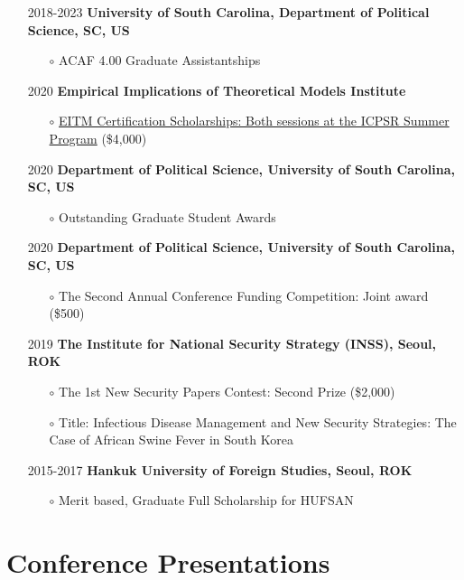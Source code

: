 \documentclass[margin,line]{res}
\begin{document}
\begin{resume}
\begin{itemize}[wide = 0pt] \itemsep 1.5mm
	\item[2018-2023] \textbf{University of South Carolina, Department of Political Science, SC, US}
	\begin{itemize} 
		\item[$\circ$] ACAF 4.00 Graduate Assistantships
	\end{itemize} 
	\item[2020] \textbf{Empirical Implications of Theoretical Models Institute}
	\begin{itemize}
		\item[$\circ$] \href{https://52.2.147.143/icpsrweb/content/sumprog/scholarships/winners-2020.html}{EITM Certification Scholarships: Both sessions at the ICPSR Summer Program} (\$4,000)
	\end{itemize} 
	\item[2020] \textbf{Department of Political Science, University of South Carolina, SC, US}
	\begin{itemize}
		\item[$\circ$] Outstanding Graduate Student Awards
	\end{itemize} 
	\item[2020] \textbf{Department of Political Science, University of South Carolina, SC, US}
	\begin{itemize}
		\item[$\circ$] The Second Annual Conference Funding Competition: Joint award (\$500)
	\end{itemize} 
	\item[2019] \textbf{The Institute for National Security Strategy (INSS), Seoul, ROK}
	\begin{itemize}\itemsep -1mm 
		\item[$\circ$] The 1st New Security Papers Contest: Second Prize (\$2,000)
		\item[$\circ$] Title: Infectious Disease Management and New Security Strategies: The Case of African Swine Fever in South Korea
	\end{itemize}
	\item[2015-2017] \textbf{Hankuk University of Foreign Studies, Seoul, ROK}
	\begin{itemize} 
		\item[$\circ$] Merit based, Graduate Full Scholarship for HUFSAN
	\end{itemize}
\end{itemize}

\section{\sc Conference Presentations}


\end{resume}
\end{document}
